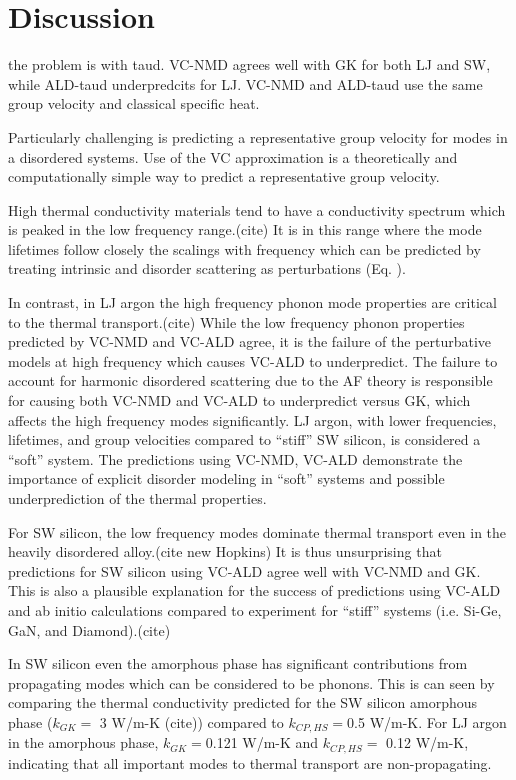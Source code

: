 \documentclass[aps,prb,twocolumn,superscriptaddress,preprintnumbers,amsmath,amssymb,floatfix]{revtex4}
\begin{document}
\section{\label{S:}Discussion}

the problem is with taud.  VC-NMD agrees well with GK for both LJ and SW, 
while ALD-taud underpredcits for LJ.  VC-NMD and ALD-taud use the same 
group velocity and classical specific heat.

Particularly challenging is predicting a representative group velocity 
for modes in a disordered systems. 
Use of the VC approximation is a theoretically and 
computationally simple way to predict a representative group velocity.

High thermal conductivity materials tend to have a conductivity spectrum 
which is peaked in the low frequency range.(cite) 
It is in this range where the mode 
lifetimes follow closely the scalings with frequency which can be 
predicted by treating intrinsic and disorder scattering as 
perturbations (Eq. ).

In contrast, 
in LJ argon the high frequency phonon mode properties are critical 
to the thermal transport.(cite)  
While the low frequency phonon properties predicted by VC-NMD and 
VC-ALD agree, it is the failure of the perturbative models at 
high frequency which causes VC-ALD to underpredict. The failure 
to account for harmonic disordered scattering due to the AF theory 
is responsible for causing both VC-NMD and VC-ALD to underpredict 
versus GK, which affects the high frequency modes significantly. 
LJ argon, with lower 
frequencies, lifetimes, and group velocities compared to 
``stiff'' SW silicon, 
is considered a ``soft'' system. The predictions using 
VC-NMD, VC-ALD demonstrate the importance of explicit disorder 
modeling in ``soft'' systems and possible underprediction 
of the thermal properties.\cite{tian_phonon_2012}

For SW silicon, the low frequency modes dominate thermal transport 
even in the heavily disordered alloy.(cite new Hopkins) 
It is thus unsurprising that predictions for 
SW silicon using VC-ALD agree well with VC-NMD and GK. This is also a 
plausible explanation for the success of predictions using 
VC-ALD and ab initio calculations compared to experiment for 
``stiff'' systems (i.e. Si-Ge, GaN, and Diamond).(cite)

In SW silicon even the amorphous phase has significant contributions 
from propagating modes which can be considered to be phonons. This is 
can seen by comparing the thermal conductivity predicted for the 
SW silicon amorphous phase ($k_{GK} =$ 3 W/m-K (cite)) compared to 
$k_{CP,HS} = $0.5 W/m-K.  For LJ argon in the amorphous phase, 
$k_{GK} = $0.121 W/m-K and $k_{CP,HS} =$ 0.12 W/m-K, indicating that 
all important modes to thermal transport are non-propagating.
\end{document}
